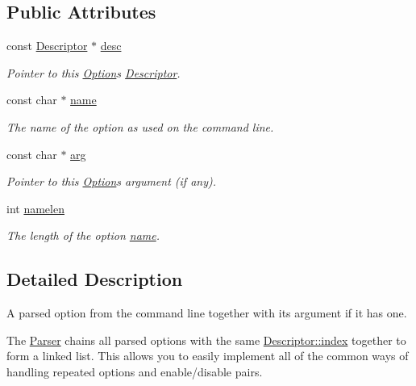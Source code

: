 \subsection*{Public Attributes}
\begin{DoxyCompactItemize}
\item 
const \hyperlink{structxmem_1_1config_1_1third__party_1_1_descriptor}{Descriptor} $\ast$ \hyperlink{classxmem_1_1config_1_1third__party_1_1_option_a561317d9c847dee40c9da4a1c2065d8a}{desc}
\begin{DoxyCompactList}\small\item\em Pointer to this \hyperlink{classxmem_1_1config_1_1third__party_1_1_option}{Option}\textquotesingle{}s \hyperlink{structxmem_1_1config_1_1third__party_1_1_descriptor}{Descriptor}. \end{DoxyCompactList}\item 
const char $\ast$ \hyperlink{classxmem_1_1config_1_1third__party_1_1_option_aa73b73027c0a9140aeec654f3fe9aef6}{name}
\begin{DoxyCompactList}\small\item\em The name of the option as used on the command line. \end{DoxyCompactList}\item 
const char $\ast$ \hyperlink{classxmem_1_1config_1_1third__party_1_1_option_a409f63d66d900e594dd86bcdfa9fd86a}{arg}
\begin{DoxyCompactList}\small\item\em Pointer to this \hyperlink{classxmem_1_1config_1_1third__party_1_1_option}{Option}\textquotesingle{}s argument (if any). \end{DoxyCompactList}\item 
int \hyperlink{classxmem_1_1config_1_1third__party_1_1_option_ab9c40a964cbbde704d77407446a76933}{namelen}
\begin{DoxyCompactList}\small\item\em The length of the option \hyperlink{classxmem_1_1config_1_1third__party_1_1_option_aa73b73027c0a9140aeec654f3fe9aef6}{name}. \end{DoxyCompactList}\end{DoxyCompactItemize}


\subsection{Detailed Description}
A parsed option from the command line together with its argument if it has one. 

The \hyperlink{classxmem_1_1config_1_1third__party_1_1_parser}{Parser} chains all parsed options with the same \hyperlink{structxmem_1_1config_1_1third__party_1_1_descriptor_aacf3d44f35c61f22be65da078f60734b}{Descriptor\+::index} together to form a linked list. This allows you to easily implement all of the common ways of handling repeated options and enable/disable pairs.


